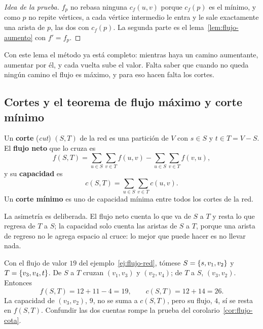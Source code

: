 \documentclass[11pt,letterpaper]{article}
\begin{document}
\begin{proof}[Idea de la prueba]
  $f_p$ no rebasa ninguna $c_f(u, v)$ porque $c_f(p)$ es el mínimo, y
  como $p$ no repite vértices, a cada vértice intermedio le entra y le
  sale exactamente una arista de $p$, las dos con $c_f(p)$. La segunda
  parte es el lema~\ref{lem:flujo-aumento} con $f' = f_p$.
\end{proof}

Con este lema el método ya está completo: mientras haya un camino
aumentante, aumentar por él, y cada vuelta sube el valor. Falta saber
que cuando no queda ningún camino el flujo es máximo, y para eso hacen
falta los cortes.


\subsection*{Cortes y el teorema de flujo máximo y corte mínimo}

\begin{definicion}[Corte]
  Un \textbf{corte} (\textit{cut}) $(S, T)$ de la red es una
  partición de $V$ con $s \in S$ y $t \in T = V - S$. El
  \textbf{flujo neto} que lo cruza es
  \[
    f(S, T) = \sum_{u \in S} \sum_{v \in T} f(u, v)
            - \sum_{u \in S} \sum_{v \in T} f(v, u) ,
  \]
  y su \textbf{capacidad} es
  \[
    c(S, T) = \sum_{u \in S} \sum_{v \in T} c(u, v) .
  \]
  Un \textbf{corte mínimo} es uno de capacidad mínima entre todos los
  cortes de la red.
\end{definicion}

La asimetría es deliberada. El flujo neto cuenta lo que va de $S$ a
$T$ y resta lo que regresa de $T$ a $S$; la capacidad solo cuenta las
aristas de $S$ a $T$, porque una arista de regreso no le agrega
espacio al cruce: lo mejor que puede hacer es no llevar nada.

\begin{ejemplo}\label{ej:flujo-corte}
  Con el flujo de valor $19$ del ejemplo~\ref{ej:flujo-red}, tómese
  $S = \left\{ s, v_1, v_2 \right\}$ y $T = \left\{ v_3, v_4, t \right\}$. De $S$ a $T$
  cruzan $(v_1, v_3)$ y $(v_2, v_4)$; de $T$ a $S$, $(v_3, v_2)$.
  Entonces
  \[
    f(S, T) = 12 + 11 - 4 = 19 , \qquad c(S, T) = 12 + 14 = 26 .
  \]
  La capacidad de $(v_3, v_2)$, $9$, no se suma a $c(S, T)$, pero su
  flujo, $4$, sí se resta en $f(S, T)$. Confundir las dos cuentas
  rompe la prueba del corolario~\ref{cor:flujo-cota}.
\end{ejemplo}
\end{document}
